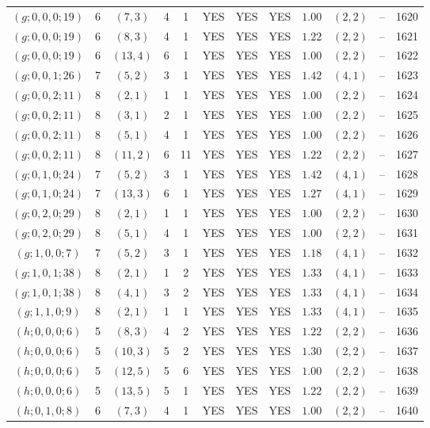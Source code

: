 \begin{longtable}{|c|c|c|c|c|c|c|c|c|c|c|c|}
$(g;0,0,0;19)$ & 6 & $(7,3)$ & 4 & 1 & YES & YES & YES & $1.00$ & $(2,2)$ & -- & 1620\\
$(g;0,0,0;19)$ & 6 & $(8,3)$ & 4 & 1 & YES & YES & YES & $1.22$ & $(2,2)$ & -- & 1621\\
$(g;0,0,0;19)$ & 6 & $(13,4)$ & 6 & 1 & YES & YES & YES & $1.00$ & $(2,2)$ & -- & 1622\\
$(g;0,0,1;26)$ & 7 & $(5,2)$ & 3 & 1 & YES & YES & YES & $1.42$ & $(4,1)$ & -- & 1623\\
$(g;0,0,2;11)$ & 8 & $(2,1)$ & 1 & 1 & YES & YES & YES & $1.00$ & $(2,2)$ & -- & 1624\\
$(g;0,0,2;11)$ & 8 & $(3,1)$ & 2 & 1 & YES & YES & YES & $1.00$ & $(2,2)$ & -- & 1625\\
$(g;0,0,2;11)$ & 8 & $(5,1)$ & 4 & 1 & YES & YES & YES & $1.00$ & $(2,2)$ & -- & 1626\\
$(g;0,0,2;11)$ & 8 & $(11,2)$ & 6 & 11 & YES & YES & YES & $1.22$ & $(2,2)$ & -- & 1627\\
$(g;0,1,0;24)$ & 7 & $(5,2)$ & 3 & 1 & YES & YES & YES & $1.42$ & $(4,1)$ & -- & 1628\\
$(g;0,1,0;24)$ & 7 & $(13,3)$ & 6 & 1 & YES & YES & YES & $1.27$ & $(4,1)$ & -- & 1629\\
$(g;0,2,0;29)$ & 8 & $(2,1)$ & 1 & 1 & YES & YES & YES & $1.00$ & $(2,2)$ & -- & 1630\\
$(g;0,2,0;29)$ & 8 & $(5,1)$ & 4 & 1 & YES & YES & YES & $1.00$ & $(2,2)$ & -- & 1631\\
$(g;1,0,0;7)$ & 7 & $(5,2)$ & 3 & 1 & YES & YES & YES & $1.18$ & $(4,1)$ & -- & 1632\\
$(g;1,0,1;38)$ & 8 & $(2,1)$ & 1 & 2 & YES & YES & YES & $1.33$ & $(4,1)$ & -- & 1633\\
$(g;1,0,1;38)$ & 8 & $(4,1)$ & 3 & 2 & YES & YES & YES & $1.33$ & $(4,1)$ & -- & 1634\\
$(g;1,1,0;9)$ & 8 & $(2,1)$ & 1 & 1 & YES & YES & YES & $1.33$ & $(4,1)$ & -- & 1635\\
$(h;0,0,0;6)$ & 5 & $(8,3)$ & 4 & 2 & YES & YES & YES & $1.22$ & $(2,2)$ & -- & 1636\\
$(h;0,0,0;6)$ & 5 & $(10,3)$ & 5 & 2 & YES & YES & YES & $1.30$ & $(2,2)$ & -- & 1637\\
$(h;0,0,0;6)$ & 5 & $(12,5)$ & 5 & 6 & YES & YES & YES & $1.00$ & $(2,2)$ & -- & 1638\\
$(h;0,0,0;6)$ & 5 & $(13,5)$ & 5 & 1 & YES & YES & YES & $1.22$ & $(2,2)$ & -- & 1639\\
$(h;0,1,0;8)$ & 6 & $(7,3)$ & 4 & 1 & YES & YES & YES & $1.00$ & $(2,2)$ & -- & 1640\\

\end{longtable}
